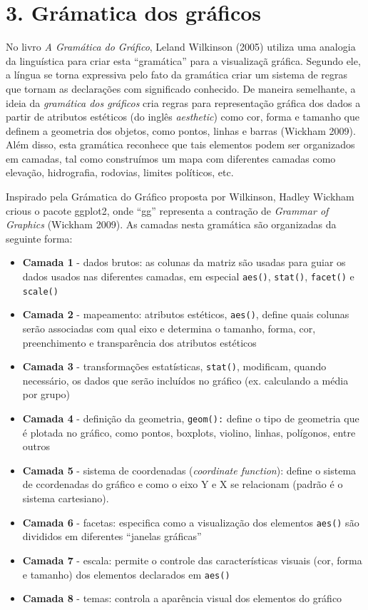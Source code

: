 \documentclass[
]{book}
\providecommand{\tightlist}{%
  \setlength{\itemsep}{0pt}\setlength{\parskip}{0pt}}
\begin{document}
\hypertarget{gruxe1matica-dos-gruxe1ficos}{%
\section{3. Grámatica dos gráficos}\label{gruxe1matica-dos-gruxe1ficos}}

No livro \emph{A Gramática do Gráfico}, Leland Wilkinson (2005) utiliza uma analogia da linguística para criar esta ``gramática'' para a visualizaçã gráfica. Segundo ele, a língua se torna expressiva pelo fato da gramática criar um sistema de regras que tornam as declarações com significado conhecido. De maneira semelhante, a ideia da \emph{gramática dos gráficos} cria regras para representação gráfica dos dados a partir de atributos estéticos (do inglês \emph{aesthetic}) como cor, forma e tamanho que definem a geometria dos objetos, como pontos, linhas e barras (Wickham 2009). Além disso, esta gramática reconhece que tais elementos podem ser organizados em camadas, tal como construímos um mapa com diferentes camadas como elevação, hidrografia, rodovias, limites políticos, etc.

Inspirado pela Grámatica do Gráfico proposta por Wilkinson, Hadley Wickham crious o pacote ggplot2, onde ``gg'' representa a contração de \emph{Grammar of Graphics} (Wickham 2009). As camadas nesta gramática são organizadas da seguinte forma:

\begin{itemize}
\tightlist
\item
  \textbf{Camada 1} - dados brutos: as colunas da matriz são usadas para guiar os dados usados nas diferentes camadas, em especial \texttt{aes()}, \texttt{stat()}, \texttt{facet()} e \texttt{scale()}
\item
  \textbf{Camada 2} - mapeamento: atributos estéticos, \texttt{aes()}, define quais colunas serão associadas com qual eixo e determina o tamanho, forma, cor, preenchimento e transparência dos atributos estéticos
\item
  \textbf{Camada 3} - transformações estatísticas, \texttt{stat()}, modificam, quando necessário, os dados que serão incluídos no gráfico (ex. calculando a média por grupo)
\item
  \textbf{Camada 4} - definição da geometria, \texttt{geom():} define o tipo de geometria que é plotada no gráfico, como pontos, boxplots, violino, linhas, polígonos, entre outros
\item
  \textbf{Camada 5} - sistema de coordenadas (\emph{coordinate function}): define o sistema de ccordenadas do gráfico e como o eixo Y e X se relacionam (padrão é o sistema cartesiano).
\item
  \textbf{Camada 6} - facetas: especifica como a visualização dos elementos \texttt{aes()} são divididos em diferentes ``janelas gráficas''
\item
  \textbf{Camada 7} - escala: permite o controle das características visuais (cor, forma e tamanho) dos elementos declarados em \texttt{aes()}
\item
  \textbf{Camada 8} - temas: controla a aparência visual dos elementos do gráfico
\end{itemize}
\end{document}
